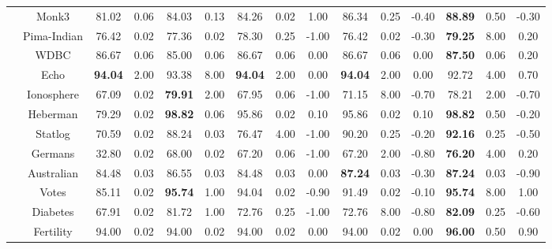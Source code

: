 \documentclass[journal,12pn, onecolumn]{IEEEtran}
\begin{document}
{{{\begin{table}
{{\begin{tabular}{ccccccccccccccc}
    \multicolumn{1}{c}{} & \multicolumn{1}{c}{Monk3} & 81.02  & 0.06  & 84.03  & 0.13  & 84.26  & 0.02  & 1.00  & 86.34  & 0.25  & -0.40  & \textbf{88.89 } & 0.50  & -0.30  \\
    \multicolumn{1}{c}{} & \multicolumn{1}{c}{Pima-Indian} & 76.42  & 0.02  & 77.36  & 0.02  & 78.30  & 0.25  & -1.00  & 76.42  & 0.02  & -0.30  & \textbf{79.25 } & 8.00  & 0.20  \\
    \multicolumn{1}{c}{} & \multicolumn{1}{c}{WDBC} & 86.67  & 0.06  & 85.00  & 0.06  & 86.67  & 0.06  & 0.00  & 86.67  & 0.06  & 0.00  & \textbf{87.50 } & 0.06  & 0.20  \\
    \multicolumn{1}{c}{} & \multicolumn{1}{c}{Echo} & \textbf{94.04 } & 2.00  & 93.38  & 8.00  & \textbf{94.04 } & 2.00  & 0.00  & \textbf{94.04 } & 2.00  & 0.00  & 92.72  & 4.00  & 0.70  \\
    \multicolumn{1}{c}{} & \multicolumn{1}{c}{Ionosphere} & 67.09  & 0.02  & \textbf{79.91 } & 2.00  & 67.95  & 0.06  & -1.00  & 71.15  & 8.00  & -0.70  & 78.21  & 2.00  & -0.70  \\
    \multicolumn{1}{c}{} & \multicolumn{1}{c}{Heberman} & 79.29  & 0.02  & \textbf{98.82 } & 0.06  & 95.86  & 0.02  & 0.10  & 95.86  & 0.02  & 0.10  & \textbf{98.82 } & 0.50  & -0.20  \\
    \multicolumn{1}{c}{} & \multicolumn{1}{c}{Statlog} & 70.59  & 0.02  & 88.24  & 0.03  & 76.47  & 4.00  & -1.00  & 90.20  & 0.25  & -0.20  & \textbf{92.16 } & 0.25  & -0.50  \\
    \multicolumn{1}{c}{} & \multicolumn{1}{c}{Germans} & 32.80  & 0.02  & 68.00  & 0.02  & 67.20  & 0.06  & -1.00  & 67.20  & 2.00  & -0.80  & \textbf{76.20 } & 4.00  & 0.20  \\
    \multicolumn{1}{c}{} & \multicolumn{1}{c}{Australian} & 84.48  & 0.03  & 86.55  & 0.03  & 84.48  & 0.03  & 0.00  & \textbf{87.24 } & 0.03  & -0.30  & \textbf{87.24 } & 0.03  & -0.90  \\
    \multicolumn{1}{c}{} & \multicolumn{1}{c}{Votes} & 85.11  & 0.02  & \textbf{95.74 } & 1.00  & 94.04  & 0.02  & -0.90  & 91.49  & 0.02  & -0.10  & \textbf{95.74 } & 8.00  & 1.00  \\
    \multicolumn{1}{c}{} & \multicolumn{1}{c}{Diabetes} & 67.91  & 0.02  & 81.72  & 1.00  & 72.76  & 0.25  & -1.00  & 72.76  & 8.00  & -0.80  & \textbf{82.09 } & 0.25  & -0.60  \\
    \multicolumn{1}{c}{} & \multicolumn{1}{c}{Fertility} & 94.00  & 0.02  & 94.00  & 0.02  & 94.00  & 0.02  & 0.00  & 94.00  & 0.02  & 0.00  & \textbf{96.00 } & 0.50  & 0.90  \\

\end{tabular}}}
\end{table}}}}
\end{document}
